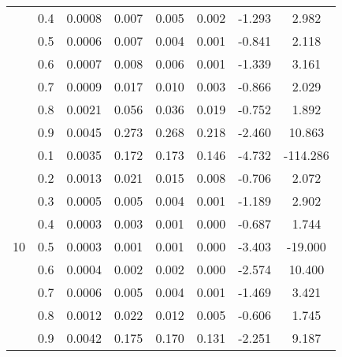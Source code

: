 \documentclass[11pt,a4paper]{report}
\begin{document}
\begin{longtable}{ | c | c || c | c | c | c | c | c | }
 & 0.4 & 0.0008 & 0.007 & 0.005 & 0.002 & -1.293 & 2.982 \\
 & 0.5 & 0.0006 & 0.007 & 0.004 & 0.001 & -0.841 & 2.118 \\
 & 0.6 & 0.0007 & 0.008 & 0.006 & 0.001 & -1.339 & 3.161 \\
 & 0.7 & 0.0009 & 0.017 & 0.010 & 0.003 & -0.866 & 2.029 \\
 & 0.8 & 0.0021 & 0.056 & 0.036 & 0.019 & -0.752 & 1.892 \\
 & 0.9 & 0.0045 & 0.273 & 0.268 & 0.218 & -2.460 & 10.863 \\
 \hline
\multirow{9}{*}{10} & 0.1 & 0.0035 & 0.172 & 0.173 & 0.146 & -4.732 & -114.286 \\
 & 0.2 & 0.0013 & 0.021 & 0.015 & 0.008 & -0.706 & 2.072 \\
 & 0.3 & 0.0005 & 0.005 & 0.004 & 0.001 & -1.189 & 2.902 \\
 & 0.4 & 0.0003 & 0.003 & 0.001 & 0.000 & -0.687 & 1.744 \\
 & 0.5 & 0.0003 & 0.001 & 0.001 & 0.000 & -3.403 & -19.000 \\
 & 0.6 & 0.0004 & 0.002 & 0.002 & 0.000 & -2.574 & 10.400 \\
 & 0.7 & 0.0006 & 0.005 & 0.004 & 0.001 & -1.469 & 3.421 \\
 & 0.8 & 0.0012 & 0.022 & 0.012 & 0.005 & -0.606 & 1.745 \\
 & 0.9 & 0.0042 & 0.175 & 0.170 & 0.131 & -2.251 & 9.187 \\
 \hline
\hline
\end{longtable}
\end{document}
